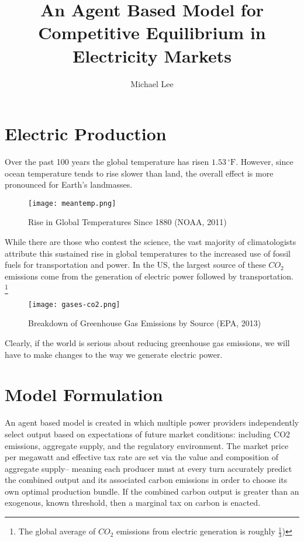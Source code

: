 \documentclass{article}
\begin{document}
\title{An Agent Based Model for Competitive Equilibrium in Electricity Markets}
\author{Michael Lee}

\maketitle{}
\newpage{}

\tableofcontents
 
\newpage 

\doublespacing
 
\section{Electric Production}
Over the past 100 years the global temperature has risen $1.53\,^{\circ}\mathrm{F}$. However, since ocean temperature tends to rise slower than land, the overall effect is more pronounced for Earth's landmasses. 

\begin{figure}[H]
	\begin{center}
	\texttt{[image: meantemp.png]}
	\caption{Rise in Global Temperatures Since 1880 (NOAA, 2011)}
	\end{center}
\end{figure}

While there are those who contest the science, the vast majority of climatologists attribute this sustained rise in global temperatures to the increased use of fossil fuels for transportation and power. In the US, the largest source of these $CO_{2}$ emissions come from the generation of electric power followed by transportation. \footnote{The global average of $CO_{2}$ emissions from electric generation is roughly $\frac{1}{3}$)}

\begin{figure}[H]
	\begin{center}
	\texttt{[image: gases-co2.png]}
	\caption{Breakdown of Greenhouse Gas Emissions by Source (EPA, 2013)}
	\end{center}
\end{figure}

Clearly, if the world is serious about reducing greenhouse gas emissions, we will have to make changes to the way we generate electric power.




\section{Model Formulation}
An agent based model is created in which multiple power providers independently select output based on expectations of future market conditions: including CO2 emissions, aggregate supply, and the regulatory environment. The market price per megawatt and effective tax rate are set via the value and composition of aggregate supply-- meaning each producer must at every turn accurately predict the combined output and its associated carbon emissions in order to choose its own optimal production bundle. If the combined carbon output is greater than an exogenous, known threshold, then a marginal tax on carbon is enacted. \* 
\end{document}
